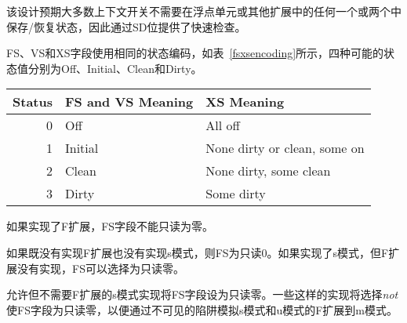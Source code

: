 \begin{commentary}
该设计预期大多数上下文开关不需要在浮点单元或其他扩展中的任何一个或两个中保存/恢复状态，因此通过SD位提供了快速检查。
\end{commentary}

\iffalse
The FS, VS, and XS fields use the same status encoding as shown in
Table~\ref{fsxsencoding}, with the four possible status values being
Off, Initial, Clean, and Dirty.
\fi

FS、VS和XS字段使用相同的状态编码，如表~\ref{fsxsencoding}所示，四种可能的状态值分别为Off、Initial、Clean和Dirty。

\begin{table*}[h!]
\begin{center}
\begin{tabular}{|r|l|l|}
\hline
Status  & FS and VS Meaning & XS Meaning\\
\hline
0 & Off     &  All off \\
1 & Initial &  None dirty or clean, some on\\
2 & Clean   &  None dirty, some clean \\
3 & Dirty   &  Some dirty \\
\hline
\end{tabular}
\end{center}
\caption{Encoding of FS[1:0], VS[1:0], and XS[1:0] status fields.}
\label{fsxsencoding}
\end{table*}

\iffalse
If the F extension is implemented, the FS field shall not be
read-only zero.

If neither the F extension nor S-mode is implemented, then FS is
read-only zero.
If S-mode is implemented but the F extension is not, FS may optionally
be read-only zero.
\fi

如果实现了F扩展，FS字段不能只读为零。

如果既没有实现F扩展也没有实现s模式，则FS为只读0。如果实现了s模式，但F扩展没有实现，FS可以选择为只读零。

\iffalse
\begin{commentary}
Implementations with S-mode but without the F extension are
permitted, but not required, to make the FS field be read-only zero.
Some such implementations will choose {\em not} to have the FS
field be read-only zero, so as to enable emulation of the F extension for
both S-mode and U-mode via invisible traps into M-mode.
\end{commentary}
\fi

\begin{commentary}
允许但不需要F扩展的s模式实现将FS字段设为只读零。一些这样的实现将选择{\em not}使FS字段为只读零，以便通过不可见的陷阱模拟s模式和u模式的F扩展到m模式。
\end{commentary}

